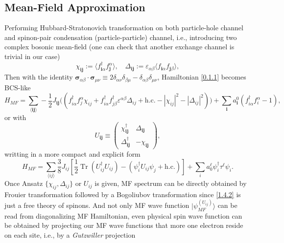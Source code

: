 \documentclass[10pt,nofootinbib]{revtex4}
\begin{document}
	\subsection{Mean-Field Approximation}
	Performing Hubbard-Stratonovich transformation on both particle-hole channel and spinon-pair condensation (particle-particle) channel, i.e., introducing two complex bosonic mean-field (one can check that another exchange channel is trivial in our case)
	\begin{equation*}
		\chi_{\bm{ij}}:=\langle f_{\bm{i}\alpha}^\dagger f_{\bm{j}}^\alpha\rangle,\quad\Delta_{\bm{ij}}:=\varepsilon_{\alpha \beta}\langle f_{\bm{i}\alpha}f_{\bm{j}\beta}\rangle,
	\end{equation*}
	Then with the identity $\bm{\sigma}_{\alpha \beta}\cdot\bm{\sigma}_{\mu \nu}\equiv2\delta_{\alpha \nu}\delta_{\beta \mu}-\delta_{\alpha \beta}\delta_{\mu \nu}$, Hamiltonian \eqref{0.1.1} becomes BCS-like
	\begin{equation}\label{1.4.1}
		H_{MF}=\sum_{\langle\bm{ij}\rangle}-\dfrac{1}{2}J_{\bm{ij}}\bigg((f_{i \alpha}^\dagger f_j^\alpha\chi_{ij}+f_{i \alpha}^\dagger f_{j \beta}^\dagger \varepsilon^{\alpha \beta}\Delta_{ij}+\text{h.c.}-|\chi_{ij}|^2-|\Delta_{ij}|^2)\bigg)+\sum_{\bm{i}}a_{\bm{i}}^0(f_{i \alpha}^\dagger f_{i}^\alpha-1),
	\end{equation}
	or with
	\begin{equation*}
		U_{\bm{ij}}\equiv\left(\begin{array}{cc}
			\chi_{\bm{ij}}^\dagger & \Delta_{\bm{ij}}\\
			\Delta_{\bm{ij}}^\dagger & -\chi_{\bm{ij}}
		\end{array}\right),
	\end{equation*}
	writting in a more compact and explicit form
	\begin{equation}\label{1.4.2}
		H_{MF}=\sum_{\langle ij\rangle}\dfrac{3}{8}J_{ij}\left[\dfrac{1}{2}\mathop{\mathrm{Tr}}(U_{ij}^\dagger U_{ij})-(\psi_i^\dagger U_{ij}\psi_j+\text{h.c.})\right]+\sum_i a_0^\ell\psi_i^\dagger\tau^\ell\psi_i.
	\end{equation}
	Once Ansatz $\{\chi_{ij},\Delta_{ij}\}$ or $U_{ij}$ is given, MF spectrum can be directly obtained by Frouier transformation followed by a Bogoliubov transformation since \eqref{1.4.2} is just a free theory of spinons. And not only MF wave function $|\psi_{MF}^{(U_{ij})}\rangle$ can be read from diagonalizing MF Hamiltonian, even physical spin wave function can be obtained by projecting our MF wave functions that more one electron reside on each site, i.e., by a \emph{Gutzwiller} projection \cite{lee2006doping}
\end{document}

